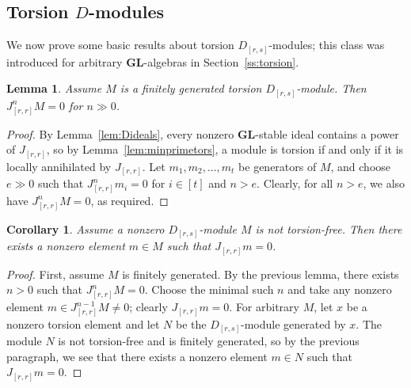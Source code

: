 \documentclass[12pt]{amsart}
\newcommand{\Drs}{D_{[r,s]}}
\newcommand{\Jrr}{J_{[r,r]}}
\newcommand{\GL}{\mathbf{GL}}
\numberwithin{equation}{section}
\newtheorem{lemma}[equation]{Lemma}
\newtheorem{corollary}[equation]{Corollary}
\theoremstyle{definition}
\theoremstyle{plain}
\begin{document}
\subsection{Torsion \texorpdfstring{$D$}{D}-modules}\label{ss:torsionD}
We now prove some basic results about torsion $\Drs$-modules; this class was introduced for arbitrary $\GL$-algebras in Section~\ref{ss:torsion}.

\begin{lemma}\label{lem:torsionJrr} 
    Assume $M$ is a finitely generated torsion $\Drs$-module. Then $\Jrr^n M = 0$ for $n \gg 0$.
\end{lemma}
\begin{proof}
By Lemma~\ref{lem:Dideals}, every nonzero $\GL$-stable ideal contains a power of $\Jrr$, so by Lemma~\ref{lem:minprimetors}, a module is torsion if and only if it is locally annihilated by $\Jrr$. Let $m_1, m_2, \ldots, m_t$ be generators of $M$, and choose $e \gg 0$ such that $\Jrr^n m_i = 0$ for $i \in [t]$ and $n > e$. Clearly, for all $n > e$, we also have $\Jrr^n M =0$, as required.
\end{proof}

\begin{corollary}\label{cor:locannihilator}
    Assume a nonzero $\Drs$-module $M$ is not torsion-free. Then there exists a nonzero element $m \in M$ such that $\Jrr m = 0$. 
\end{corollary}
\begin{proof}
    First, assume $M$ is finitely generated. By the previous lemma, there exists $n > 0$ such that $\Jrr^n M = 0$. Choose the minimal such $n$ and take any nonzero element $m \in \Jrr^{n-1} M \ne 0$; clearly $\Jrr m = 0$. For arbitrary $M$, let $x$ be a nonzero torsion element and let $N$ be the $\Drs$-module generated by $x$. The module $N$ is not torsion-free and is finitely generated, so by the previous paragraph, we see that there exists a nonzero element $m \in N$ such that $\Jrr m = 0$.
\end{proof}
\end{document}
